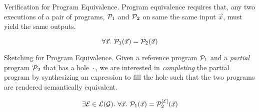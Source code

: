\begin{frame}{Verification for Program Equivalence.}
    Program equivalence requires that, any two executions of a pair of programs, $\mathcal{P}_1$ and $\mathcal{P}_2$ on same the same input $\vec{x}$, must yield the same outputs.
    \pause
    \begin{tcolorbox}[
        colback=white,
        colframe=green,
        colbacktitle=white!70!green,
        coltitle=black,
        title=\textbf{A Verification Problem},
        enhanced,
        attach boxed title to top left={yshift=-2mm, xshift=0.5cm},%
        ]
        \[
        \forall \vec{x}.\ \mathcal{P}_1(\vec{x}) = \mathcal{P}_2(\vec{x})
        \]
    \end{tcolorbox}
\end{frame}

\begin{frame}{Sketching for Program Equivalence.}
    Given a reference program $\mathcal{P}_1$ and a \textit{partial} program $\mathcal{P}_2$ that has a hole $\boxed{\cdot}$, we are interested in \textit{completing} the partial program by synthesizing an expression to fill the hole such that the two programs are rendered semantically equivalent.
    \pause
    \begin{tcolorbox}[
        colback=white,
        colframe=blue,
        colbacktitle=white!70!blue,
        coltitle=black,
        title=\textbf{Formal Definition},
        enhanced,
        attach boxed title to top left={yshift=-2mm, xshift=0.5cm},%
        ]
        \[ \exists \E \in \lang.\ \forall \vec{x}.\ \prog_1(\vec{x}) = \proghole{2}{\E}(\vec{x}) \]
    \end{tcolorbox}
\end{frame}

